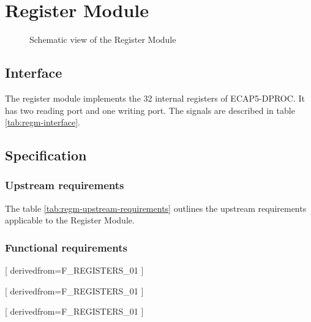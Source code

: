 \section{Register Module}

\begin{figure}[h!]
    \centering
    
    \caption{Schematic view of the Register Module}
    \label{fig:regm}
\end{figure}

\subsection{Interface}

\begin{content}
The register module implements the 32 internal registers of ECAP5-DPROC. It has two reading port and one writing port. The signals are described in table \ref{tab:regm-interface}. 
\end{content}



\subsection{Specification}

\subsubsection{Upstream requirements}

The table \ref{tab:regm-upstream-requirements} outlines the upstream requirements applicable to the Register Module.



\subsubsection{Functional requirements}

[
  derivedfrom=F\_REGISTERS\_01
]

[
  derivedfrom=F\_REGISTERS\_01
]

[
  derivedfrom=F\_REGISTERS\_01
]

